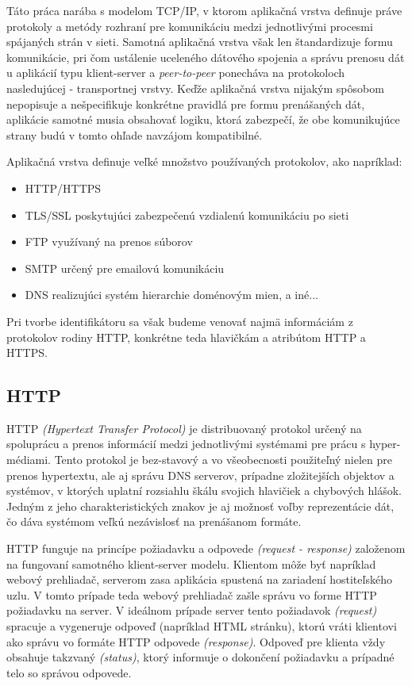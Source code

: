 \documentclass[
  digital, %
  table,   %
  lof,     %
  nolot,   %
  nocover
]{fithesis3}
\begin{document}
Táto práca narába s modelom TCP/IP, v ktorom aplikačná vrstva definuje práve
protokoly a metódy rozhraní pre komunikáciu medzi jednotlivými procesmi
spájaných strán v sieti. Samotná aplikačná vrstva však len štandardizuje formu
komunikácie, pri čom ustálenie uceleného dátového spojenia a správu prenosu dát
u aplikácií typu klient-server a \textit{peer-to-peer} ponecháva na protokoloch
nasledujúcej - transportnej vrstvy. Keďže aplikačná vrstva nijakým spôsobom
nepopisuje a nešpecifikuje konkrétne pravidlá pre formu prenášaných dát,
aplikácie samotné musia obsahovať logiku, ktorá zabezpečí, že obe komunikujúce
strany budú v tomto ohľade navzájom kompatibilné.

Aplikačná vrstva definuje veľké množstvo používaných protokolov, ako napríklad:
\begin{itemize}
	\item HTTP/HTTPS
	\item TLS/SSL poskytujúci zabezpečenú vzdialenú komunikáciu po sieti
	\item FTP využívaný na prenos súborov
	\item SMTP určený pre emailovú komunikáciu
	\item DNS realizujúci systém hierarchie doménovým mien, a iné...
\end{itemize}
Pri tvorbe identifikátoru sa však budeme venovať najmä informáciám z protokolov
rodiny HTTP, konkrétne teda hlavičkám a atribútom HTTP a HTTPS.

\subsection{HTTP}
HTTP \textit{(Hypertext Transfer Protocol)} je distribuovaný protokol určený
na spoluprácu a prenos informácií medzi jednotlivými systémami pre
prácu s hyper-médiami. Tento protokol je bez-stavový a vo všeobecnosti
použiteľný nielen pre prenos hypertextu, ale aj správu DNS serverov, prípadne
zložitejších objektov a systémov, v ktorých uplatní rozsiahlu škálu svojich
hlavičiek a chybových hlášok. Jedným z jeho charakteristických znakov je aj
možnosť voľby reprezentácie dát, čo dáva systémom veľkú nezávislosť na
prenášanom formáte.

HTTP funguje na princípe požiadavku a odpovede \textit{(request - response)}
založenom na fungovaní samotného klient-server modelu. Klientom môže byť
napríklad webový prehliadač, serverom zasa aplikácia spustená na zariadení
hostiteľského uzlu. V tomto prípade teda webový prehliadač zašle správu vo
forme HTTP požiadavku na server. V ideálnom prípade server tento požiadavok
\textit{(request)} spracuje a vygeneruje odpoveď (napríklad HTML stránku),
ktorú vráti klientovi ako správu vo formáte HTTP odpovede \textit{(response)}.
Odpoveď pre klienta vždy obsahuje takzvaný \textit{(status)}, ktorý informuje o
dokončení požiadavku a prípadné telo so správou odpovede.
\end{document}
